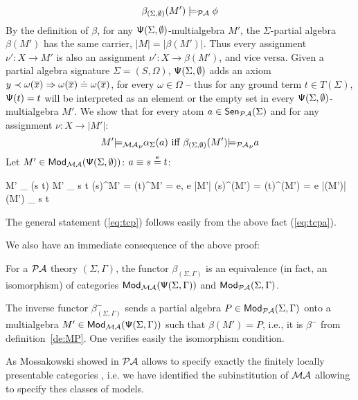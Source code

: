 \documentclass[10pt]{article}
\begin{document}
\begin{PROOF}
\begin{equation}
\beta_{(\Sigma,\emptyset)} (M') \models_{{\mathcal{PA}}} \phi  
\end{equation}
\noindent
By the definition of $\beta$, for any ${\sf {\Psi}}(\Sigma,\emptyset)$-multialgebra
$M'$, the $\Sigma$-partial algebra $\beta(M')$ has the same carrier, $|M|=
|\beta(M')|$. Thus every assignment $\nu': X \to M'$ is also an assignment
$\nu': X \to \beta(M')$, and vice versa.  Given a partial algebra signature
$\Sigma=(S,\Omega)$, ${\sf {\Psi}}(\Sigma,\emptyset)$ adds an axiom $ y \prec
\omega(\overline{x}) \Rightarrow \omega(\overline{x}) \mathrel{\dot{=} } \omega(\overline{x})$,
for every $\omega \in \Omega$ -- thus for any ground term $t\in T(\Sigma)$,
${\sf {\Psi}}(t)=t$ will be interpreted as an element or the empty set in every
${\sf {\Psi}}(\Sigma,\emptyset)$-multialgebra $M'$.  We show that for every atom $a
\in {\sf {Sen}}_{{\mathcal{PA}}}(\Sigma)$ and for any assignment $\nu:X\to|M'|$:
\begin{equation}\label{eq:tcpa}
M' {\models_{{\mathcal{MA}}}}_{\nu} \alpha_{\Sigma}(a) \mbox{ iff 
} \beta_{(\Sigma,\emptyset)} (M') {\models_{{\mathcal{PA}}}}_{\nu} a
\end{equation}
%
Let $M' \in {\sf {Mod}}_{{\mathcal{MA}}}({\sf {\Psi}}(\Sigma,\emptyset))$:
$a \equiv s \stackrel{e}{=} t$:	
		\begin{eqp}
			M' \models_{\nu} \alpha(s \eequal t)
			M' \models_{\nu} s \eleq t
			{\nu}(s)^{M'} = {\nu}(t)^{M'} = {e}, e \in |M'|
			{\nu}(s)^{\beta(M')} = {\nu}(t)^{\beta(M')} = e \in 
|\beta(M')|
			{\beta(M')} \models_{\nu} s \eequal t
		\end{eqp}
The general statement (\ref{eq:tcp}) follows easily from the above fact (\ref{eq:tcpa}).
\end{PROOF}
We also have an immediate consequence of the above proof:
\begin{fact}\label{fa:iso}
For a ${\mathcal{PA}}$ theory $(\Sigma,\Gamma)$, 
the functor $\beta_{(\Sigma,\Gamma)}$ is an equivalence (in fact, an
isomorphism) of categories ${\sf {Mod}}_{{\mathcal{MA}}}({\sf {\Psi}}(\Sigma,\Gamma))$ and
${\sf {Mod}}_{{\mathcal{PA}}}(\Sigma,\Gamma)$. 
\end{fact}
\begin{PROOF}
The
inverse functor $\beta^{-}_{(\Sigma,\Gamma)}$ sends a partial algebra
$P\in{\sf {Mod}}_{{\mathcal{PA}}}(\Sigma,\Gamma)$ onto a multialgebra
$M'\in{\sf {Mod}}_{{\mathcal{MA}}}({\sf {\Psi}}(\Sigma,\Gamma))$ such that $\beta(M')=P$, i.e.,
it is $\beta^-$ from definition~\ref{de:MP}. One verifies easily the
isomorphism condition.
\end{PROOF}
%
As Mossakowski showed in \cite{mossa} ${\mathcal{PA}}$ allows to
specify exactly the finitely locally presentable categories \cite{locally},
i.e. we have identified the subinstitution of ${\mathcal{MA}}$ allowing to specify
thes classes of models. 
\end{document}
